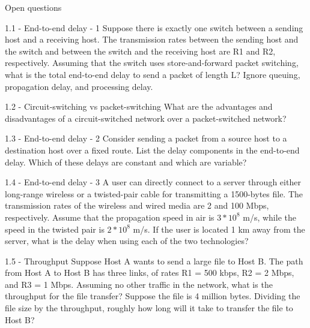 \documentclass[a4paper]{article}
\begin{document}
\begin{quiz}{Open questions}


\begin{essay}[points=1]{1.1 - End-to-end delay - 1}
Suppose there is exactly one switch between a sending host and a receiving host. The transmission rates between the sending host and the switch and between the switch and the receiving host are R1 and R2, respectively. Assuming that the switch uses store-and-forward packet switching, what is the total end-to-end delay to send a packet of length L? Ignore queuing, propagation delay, and processing delay.
\end{essay}

\begin{essay}[points=1]{1.2 - Circuit-switching vs packet-switching}
What are the advantages and disadvantages of a circuit-switched network over a packet-switched network? 
\end{essay}

\begin{essay}[points=1]{1.3 - End-to-end delay - 2}
Consider sending a packet from a source host to a destination host over a fixed route. List the delay components in the end-to-end delay. Which of these delays are constant and which are variable? 
\end{essay}

\begin{essay}[points=1]{1.4 - End-to-end delay - 3}
A user can directly connect to a server through either long-range wireless or a twisted-pair cable for transmitting a 1500-bytes file. The transmission rates of the wireless and wired media are 2 and 100 Mbps, respectively. Assume that the propagation speed in air is $3*10^8$ m/s, while the speed in the twisted pair is $2*10^8$ m/s. If the user is located 1 km away from the server, what is the delay when using each of the two technologies? 
\end{essay}

\begin{essay}[points=1]{1.5 - Throughput}
Suppose Host A wants to send a large file to Host B. The path from Host A to Host B has three links, of rates R1 = 500 kbps, R2 = 2 Mbps, and R3 = 1 Mbps. Assuming no other traffic in the network, what is the throughput for the file transfer? Suppose the file is 4 million bytes. Dividing the file size by the throughput, roughly how long will it take to transfer the file to Host B?
\end{essay}


\end{quiz}
\end{document}
